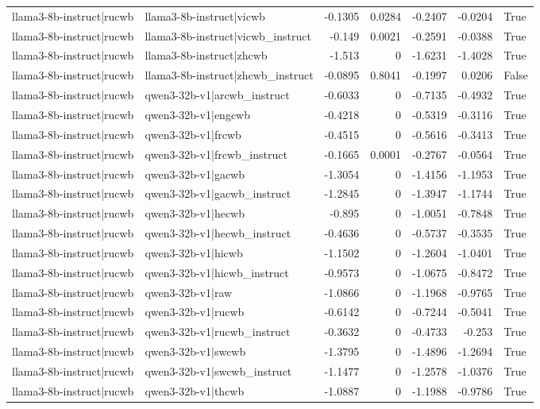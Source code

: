 \begin{table}
\begin{tabular}{l l r r r r l}
llama3-8b-instruct|rucwb & llama3-8b-instruct|vicwb & -0.1305 & 0.0284 & -0.2407 & -0.0204 & True \\
llama3-8b-instruct|rucwb & llama3-8b-instruct|vicwb_instruct & -0.149 & 0.0021 & -0.2591 & -0.0388 & True \\
llama3-8b-instruct|rucwb & llama3-8b-instruct|zhcwb & -1.513 & 0 & -1.6231 & -1.4028 & True \\
llama3-8b-instruct|rucwb & llama3-8b-instruct|zhcwb_instruct & -0.0895 & 0.8041 & -0.1997 & 0.0206 & False \\
llama3-8b-instruct|rucwb & qwen3-32b-v1|arcwb_instruct & -0.6033 & 0 & -0.7135 & -0.4932 & True \\
llama3-8b-instruct|rucwb & qwen3-32b-v1|engcwb & -0.4218 & 0 & -0.5319 & -0.3116 & True \\
llama3-8b-instruct|rucwb & qwen3-32b-v1|frcwb & -0.4515 & 0 & -0.5616 & -0.3413 & True \\
llama3-8b-instruct|rucwb & qwen3-32b-v1|frcwb_instruct & -0.1665 & 0.0001 & -0.2767 & -0.0564 & True \\
llama3-8b-instruct|rucwb & qwen3-32b-v1|gacwb & -1.3054 & 0 & -1.4156 & -1.1953 & True \\
llama3-8b-instruct|rucwb & qwen3-32b-v1|gacwb_instruct & -1.2845 & 0 & -1.3947 & -1.1744 & True \\
llama3-8b-instruct|rucwb & qwen3-32b-v1|hecwb & -0.895 & 0 & -1.0051 & -0.7848 & True \\
llama3-8b-instruct|rucwb & qwen3-32b-v1|hecwb_instruct & -0.4636 & 0 & -0.5737 & -0.3535 & True \\
llama3-8b-instruct|rucwb & qwen3-32b-v1|hicwb & -1.1502 & 0 & -1.2604 & -1.0401 & True \\
llama3-8b-instruct|rucwb & qwen3-32b-v1|hicwb_instruct & -0.9573 & 0 & -1.0675 & -0.8472 & True \\
llama3-8b-instruct|rucwb & qwen3-32b-v1|raw & -1.0866 & 0 & -1.1968 & -0.9765 & True \\
llama3-8b-instruct|rucwb & qwen3-32b-v1|rucwb & -0.6142 & 0 & -0.7244 & -0.5041 & True \\
llama3-8b-instruct|rucwb & qwen3-32b-v1|rucwb_instruct & -0.3632 & 0 & -0.4733 & -0.253 & True \\
llama3-8b-instruct|rucwb & qwen3-32b-v1|swcwb & -1.3795 & 0 & -1.4896 & -1.2694 & True \\
llama3-8b-instruct|rucwb & qwen3-32b-v1|swcwb_instruct & -1.1477 & 0 & -1.2578 & -1.0376 & True \\
llama3-8b-instruct|rucwb & qwen3-32b-v1|thcwb & -1.0887 & 0 & -1.1988 & -0.9786 & True \\

\end{tabular}
\end{table}
